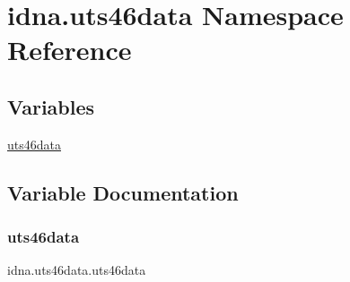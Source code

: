 \hypertarget{namespaceidna_1_1uts46data}{}\section{idna.\+uts46data Namespace Reference}
\label{namespaceidna_1_1uts46data}
\subsection*{Variables}
\begin{DoxyCompactItemize}
\item 
\hyperlink{namespaceidna_1_1uts46data_ad1c487652a972e534c49c1208a82b2ed}{uts46data}
\end{DoxyCompactItemize}


\subsection{Variable Documentation}
\mbox{\label{namespaceidna_1_1uts46data_ad1c487652a972e534c49c1208a82b2ed}} 
\subsubsection{\texorpdfstring{uts46data}{uts46data}}
{\footnotesize\ttfamily idna.\+uts46data.\+uts46data}

